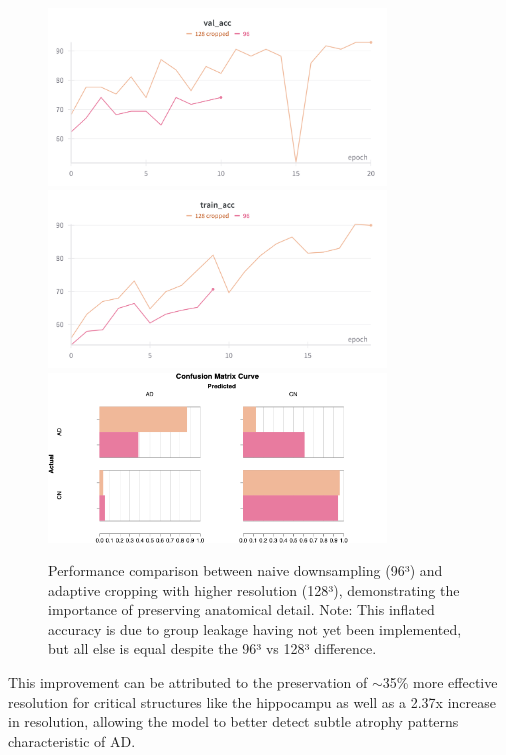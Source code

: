 \documentclass[11pt, a4paper]{article}
\begin{document}
\begin{figure}[htbp]
  \centering
  \includegraphics[width=0.8\textwidth]{figures/crop_val_acc.png}
  \includegraphics[width=0.8\textwidth]{figures/crop_train_acc.png}
  \includegraphics[width=0.8\textwidth]{figures/crop_CM.png}
  \caption{Performance comparison between naive downsampling (96³) and adaptive cropping with higher resolution (128³), demonstrating the importance of preserving anatomical detail. Note: This inflated accuracy is due to group leakage having not yet been implemented, but all else is equal despite the 96³ vs 128³ difference.}
  \label{fig:cropping_impact}
\end{figure}

This improvement can be attributed to the preservation of $\sim$35\% more effective resolution for critical structures like the hippocampu as well as a 2.37x increase in resolution, allowing the model to better detect subtle atrophy patterns characteristic of AD.
\end{document}

